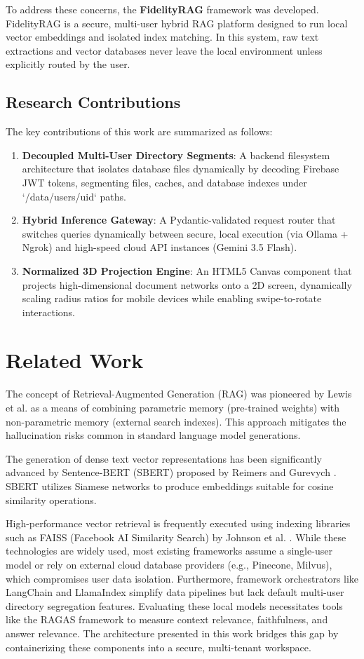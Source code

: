 \documentclass[11pt,journal,onecolumn]{article}
\begin{document}
To address these concerns, the \textbf{FidelityRAG} framework was developed. FidelityRAG is a secure, multi-user hybrid RAG platform designed to run local vector embeddings and isolated index matching. In this system, raw text extractions and vector databases never leave the local environment unless explicitly routed by the user.

\subsection{Research Contributions}
The key contributions of this work are summarized as follows:
\begin{enumerate}
    \item \textbf{Decoupled Multi-User Directory Segments}: A backend filesystem architecture that isolates database files dynamically by decoding Firebase JWT tokens, segmenting files, caches, and database indexes under `/data/users/{uid}` paths.
    \item \textbf{Hybrid Inference Gateway}: A Pydantic-validated request router that switches queries dynamically between secure, local execution (via Ollama + Ngrok) and high-speed cloud API instances (Gemini 3.5 Flash).
    \item \textbf{Normalized 3D Projection Engine}: An HTML5 Canvas component that projects high-dimensional document networks onto a 2D screen, dynamically scaling radius ratios for mobile devices while enabling swipe-to-rotate interactions.
\end{enumerate}

\section{Related Work}
The concept of Retrieval-Augmented Generation (RAG) was pioneered by Lewis et al. \cite{lewis2020rag} as a means of combining parametric memory (pre-trained weights) with non-parametric memory (external search indexes). This approach mitigates the hallucination risks common in standard language model generations. 

The generation of dense text vector representations has been significantly advanced by Sentence-BERT (SBERT) proposed by Reimers and Gurevych \cite{reimers2019sbert}. SBERT utilizes Siamese networks to produce embeddings suitable for cosine similarity operations. 

High-performance vector retrieval is frequently executed using indexing libraries such as FAISS (Facebook AI Similarity Search) by Johnson et al. \cite{johnson2019faiss}. While these technologies are widely used, most existing frameworks assume a single-user model or rely on external cloud database providers (e.g., Pinecone, Milvus), which compromises user data isolation. Furthermore, framework orchestrators like LangChain \cite{chase2022langchain} and LlamaIndex \cite{liu2022llamaindex} simplify data pipelines but lack default multi-user directory segregation features. Evaluating these local models necessitates tools like the RAGAS framework \cite{es2023ragas} to measure context relevance, faithfulness, and answer relevance. The architecture presented in this work bridges this gap by containerizing these components into a secure, multi-tenant workspace.
\end{document}
